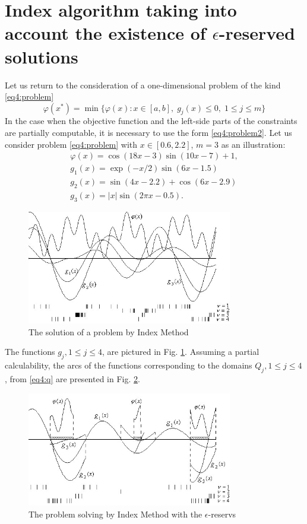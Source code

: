 \section{Index algorithm taking into account the existence of $\epsilon$-reserved solutions}
Let us return to the consideration of a one-dimensional problem of the kind \eqref{eq4:problem}
\begin{displaymath}
  \varphi(x^*)=\min\{\varphi(x):x\in [a,b],\; g_j(x)\le 0, \; 1\le j\le m\}
\end{displaymath}
In the case when the objective function and the left-side parts of the constraints are partially computable, it is necessary to use the form \eqref{eq4:problem2}.
\example
{
Let us consider problem \eqref{eq4:problem} with $x\in[0.6,2.2]$, $m=3$ as an illustration:
\begin{gather*}
\varphi(x)=\cos(18x-3)\sin(10x-7)+1, \\
g_1(x)=\exp(-x/2)\sin(6x-1.5) \\
g_2(x)=\sin(4x-2.2)+\cos(6x-2.9) \\
g_3(x)=|x|\sin(2\pi x - 0.5).
\end{gather*}
}
\begin{figure}[ht]
  \centering
  \includegraphics[width=0.8\textwidth]{figures/4_7.jpg}
  \caption{The solution of a problem by Index Method}
  \label{fig:4_7}
\end{figure}
The functions $g_j , 1\le j\le 4$, are pictured in Fig. \ref{fig:4_7}. Assuming a partial calculability, the arcs of
the functions corresponding to the domains $Q_j ,1\le j\le 4$, from \eqref{eq4:q} are presented in Fig. \ref{fig:4_8}.

\begin{figure}[ht]
  \centering
  \includegraphics[width=0.8\textwidth]{figures/4_8.jpg}
  \caption{The problem solving by Index Method with the $\epsilon$-reservs}
  \label{fig:4_8}
\end{figure}

